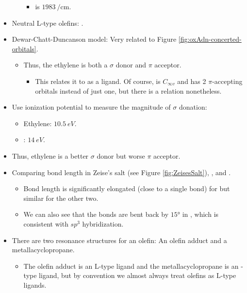 \documentclass[../notes.tex]{subfiles}
\begin{document}
\begin{itemize}
\begin{itemize}
\begin{itemize}
            \item {} is $\SI{1983}{\per\centi\meter}$.
        \end{itemize}
    \end{itemize}
    \item Neutral L-type olefins: .
    \item Dewar-Chatt-Duncanson model: Very related to Figure \ref{fig:oxAdn-concerted-orbitals}.
    \begin{itemize}
        \item Thus, the ethylene is both a $\sigma$ donor and $\pi$ acceptor.
        \begin{itemize}
            \item This relates it to  as a ligand. Of course,  is $C_{\infty v}$ and  has 2 $\pi$-accepting orbitals instead of just one, but there is a relation nonetheless.
        \end{itemize}
    \end{itemize}
    \item Use ionization potential to measure the magnitude of $\sigma$ donation:
    \begin{itemize}
        \item Ethylene: $\SI{10.5}{eV}$.
        \item {}: $\SI{14}{eV}$.
    \end{itemize}
    \item Thus, ethylene is a better $\sigma$ donor but worse $\pi$ acceptor.
    \item Comparing  bond length in Zeise's salt (see Figure \ref{fig:ZeisesSalt}), , and .
    \begin{itemize}
        \item Bond length is significantly elongated (close to a  single bond) for  but similar for the other two.
        \item We can also see that the  bonds are bent back by $\ang{15}$ in , which is consistent with $sp^3$ hybridization.
    \end{itemize}
    \item There are two resonance structures for an olefin: An olefin adduct and a metallacyclopropane.
    \begin{itemize}
        \item The olefin adduct is an L-type ligand and the metallacyclopropane is an -type ligand, but by convention we almost always treat olefins as L-type ligands.

\end{itemize}
\end{itemize}
\end{document}
